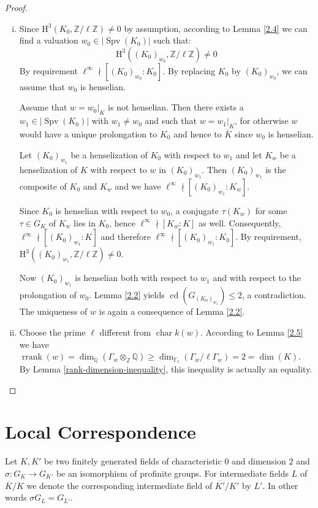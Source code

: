 \begin{proof}
\begin{enumerate}[(i)]
\item Since $\mathrm{H}^3(K_0, \mathbb{Z}/\ell\mathbb{Z})\neq 0$ by assumption, according to Lemma \ref{2.4} we can find a valuation $w_0\in|\operatorname{Spv}(K_0)|$ such that:
\[ \mathrm{H}^3((K_0)_{w_0}, \mathbb{Z}/\ell\mathbb{Z}) \neq 0 \]
By requirement $\ell^\infty \nmid [(K_0)_{w_0} : K_0]$. By replacing $K_0$ by $(K_0)_{w_0}$, we can assume that $w_0$ is henselian.

Assume that $w = w_0|_K$ is not henselian. Then there exists a $w_1\in|\operatorname{Spv}(K_0)|$ with $w_1\neq w_0$ and such that $w = w_1|_K$, for otherwise $w$ would have a unique prolongation to $K_0$ and hence to $\overline{K}$ since $w_0$ is henselian.

Let $(K_0)_{w_1}$ be a henselization of $K_0$ with respect to $w_1$ and let $K_w$ be a henselization of $K$ with respect to $w$ in $(K_0)_{w_1}$. Then $(K_0)_{w_1}$ is the composite of $K_0$ and $K_w$ and we have $\ell^\infty\nmid [(K_0)_{w_1} : K_w]$.

Since $K_0$ is henselian with respect to $w_0$, a conjugate $\tau(K_w)$ for some $\tau\in G_K$ of $K_w$ lies in $K_0$, hence $\ell^\infty\nmid [K_w : K]$ as well. Consequently, $\ell^\infty \nmid [(K_0)_{w_1} : K]$ and therefore $\ell^\infty \nmid [(K_0)_{w_1} : K_0]$. By requirement, $\mathrm{H}^3((K_0)_{w_1}, \mathbb{Z}/\ell\mathbb{Z}) \neq 0$.

Now $(K_0)_{w_1}$ is henselian both with respect to $w_1$ and with respect to the prolongation of $w_0$. Lemma \ref{2.2} yields $\operatorname{cd}(G_{(K_0)_{w_1}})\leq 2$, a contradiction. The uniqueness of $w$ is again a consequence of Lemma \ref{2.2}.
\item Choose the prime $\ell$ different from $\operatorname{char} k(w)$. According to Lemma \ref{2.5} we have $\operatorname{rrank}(w)=\dim_\mathbb{Q}(\Gamma_w\otimes_\mathbb{Z}\mathbb{Q} )\geq \dim_{\mathbb{F}_\ell}(\Gamma_w /\ell\Gamma_w) = 2 = \dim(K)$. By Lemma \ref{rank-dimension-inequality}, this inequality is actually an equality.
\end{enumerate}
\end{proof}

\section{Local Correspondence}

Let $K,K'$ be two finitely generated fields of characteristic $0$ and dimension $2$ and $\sigma:G_K\to G_{K'}$ be an isomorphism of profinite groups. For intermediate fields $L$ of $\overline{K}/K$ we denote the corresponding intermediate field of $\overline{K'}/K'$ by $L'$. In other words $\sigma G_L=G_{L'}$.


